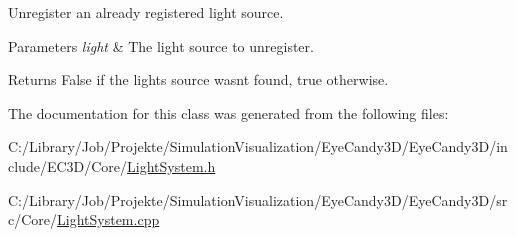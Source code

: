 Unregister an already registered light source. 


\begin{DoxyParams}{Parameters}
{\em light} & The light source to unregister. \\
\hline
\end{DoxyParams}
\begin{DoxyReturn}{Returns}
False if the lights source wasn\textquotesingle{}t found, true otherwise. 
\end{DoxyReturn}


The documentation for this class was generated from the following files\+:\begin{DoxyCompactItemize}
\item 
C\+:/\+Library/\+Job/\+Projekte/\+Simulation\+Visualization/\+Eye\+Candy3\+D/\+Eye\+Candy3\+D/include/\+E\+C3\+D/\+Core/\mbox{\hyperlink{_light_system_8h}{Light\+System.\+h}}\item 
C\+:/\+Library/\+Job/\+Projekte/\+Simulation\+Visualization/\+Eye\+Candy3\+D/\+Eye\+Candy3\+D/src/\+Core/\mbox{\hyperlink{_light_system_8cpp}{Light\+System.\+cpp}}\end{DoxyCompactItemize}
